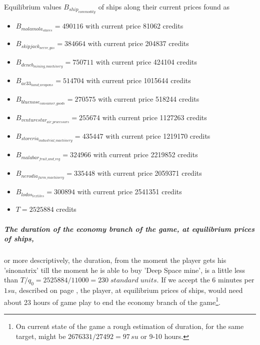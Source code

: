 \documentclass[]{article}
\begin{document}
Equilibrium values $B_{ship_{commodity}}$ of ships along their current prices found as\label{equilibriumSolution}
\begin{itemize}
	\item $B_{molamola_{slaves}}=490116$ with current price 81062 credits
	\item $B_{skipjack_{nerve\_gas}}=384664$  with current price 204837 credits
	\item $B_{deneb_{mining\_machinery}}=750711$  with current price 424104 credits
	\item $B_{ac33_{hand\_weapons}}=514704$  with current price 1015644 credits
	\item $B_{bluenose_{consumer\_goods}}=270575$  with current price 518244 credits
	\item $B_{venturestar_{air\_processors}}=255674$  with current price 1127263 credits	
	\item $B_{storeria_{industrial\_machinery}}=435447$  with current price 1219170 credits	
	\item $B_{malabar_{fruit\_and\_veg}}=324966$  with current price 2219852 credits
	\item $B_{nerodia_{farm\_machinery}}=335448$  with current price 2059371 credits
	\item $B_{lodos_{textiles}}=300894$  with current price 2541351 credits
	\item $T=2525884$ credits
\end{itemize}

\subparagraph{The duration of the economy branch of the game, at equilibrium prices of ships,} or more descriptively, the duration, from the moment the player gets his 'sinonatrix' till the moment he is able to buy 'Deep Space mine', is a little less than $T/q_{0}=2525884/11000=230\;standard\;units.$ If we accept the 6 minutes per $1su$, described on page \pageref{standard_unit}, the player, at equilibrium prices of ships, would need about 23 hours of game play to end the economy branch of the game\footnote{On current state of the game a rough estimation of duration, for the same target, might be $2676331/27492=97\, su$ or 9-10 hours.}.
\end{document}
